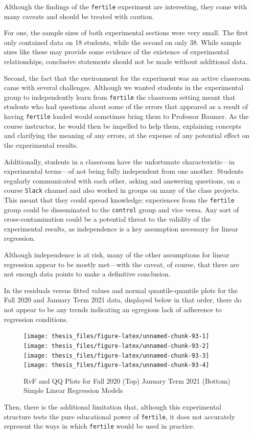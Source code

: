 \documentclass[12pt,twoside]{reedthesis}
\begin{document}
Although the findings of the \texttt{fertile} experiment are interesting, they come with many caveats and should be treated with caution.

For one, the sample sizes of both experimental sections were very small. The first only contained data on 18 students, while the second on only 38. While sample sizes like these may provide some evidence of the existence of experimental relationships, conclusive statements should not be made without additional data.

Second, the fact that the environment for the experiment was an active classroom came with several challenges. Although we wanted students in the experimental group to independently learn from \texttt{fertile} the classroom setting meant that students who had questions about some of the errors that appeared as a result of having \texttt{fertile} loaded would sometimes bring them to Professor Baumer. As the course instructor, he would then be impelled to help them, explaining concepts and clarifying the meaning of any errors, at the expense of any potential effect on the experimental results.

Additionally, students in a classroom have the unfortunate characteristic---in experimental terms---of not being fully independent from one another. Students regularly communicated with each other, asking and answering questions, on a course \texttt{Slack} channel and also worked in groups on many of the class projects. This meant that they could spread knowledge; experiences from the \texttt{fertile} group could be disseminated to the \texttt{control} group and vice versa. Any sort of cross-contamination could be a potential threat to the validity of the experimental results, as independence is a key assumption necessary for linear regression.

Although independence is at risk, many of the other assumptions for linear regression appear to be mostly met---with the caveat, of course, that there are not enough data points to make a definitive conclusion.

In the residuals versus fitted values and normal quantile-quantile plots for the Fall 2020 and January Term 2021 data, displayed below in that order, there do not appear to be any trends indicating an egregious lack of adherence to regression conditions.
\begin{figure}
\texttt{[image: thesis\_files/figure-latex/unnamed-chunk-93-1]} \texttt{[image: thesis\_files/figure-latex/unnamed-chunk-93-2]} \texttt{[image: thesis\_files/figure-latex/unnamed-chunk-93-3]} \texttt{[image: thesis\_files/figure-latex/unnamed-chunk-93-4]} \caption{RvF and QQ Plots for Fall 2020 (Top) January Term 2021 (Bottom) Simple Linear Regression Models}\label{fig:unnamed-chunk-93}
\end{figure}
Then, there is the additional limitation that, although this experimental structure tests the pure educational power of \texttt{fertile}, it does not accurately represent the ways in which \texttt{fertile} would be used in practice.
\end{document}
